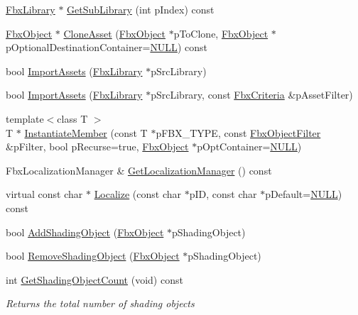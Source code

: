 \begin{DoxyCompactItemize}
\hyperlink{class_fbx_library}{Fbx\+Library} $\ast$ \hyperlink{class_fbx_library_a3a6f41a432b2f0db2966f51d8ccc511e}{Get\+Sub\+Library} (int p\+Index) const
\item 
\hyperlink{class_fbx_object}{Fbx\+Object} $\ast$ \hyperlink{class_fbx_library_ad1c56ae40f4e371c7e0395ce3362dbcc}{Clone\+Asset} (\hyperlink{class_fbx_object}{Fbx\+Object} $\ast$p\+To\+Clone, \hyperlink{class_fbx_object}{Fbx\+Object} $\ast$p\+Optional\+Destination\+Container=\hyperlink{fbxarch_8h_a070d2ce7b6bb7e5c05602aa8c308d0c4}{N\+U\+LL}) const
\item 
bool \hyperlink{class_fbx_library_a1b1dd291ec8d1858225190ae40600581}{Import\+Assets} (\hyperlink{class_fbx_library}{Fbx\+Library} $\ast$p\+Src\+Library)
\item 
bool \hyperlink{class_fbx_library_a2970dc9bde3b76130571ad959cd58389}{Import\+Assets} (\hyperlink{class_fbx_library}{Fbx\+Library} $\ast$p\+Src\+Library, const \hyperlink{class_fbx_criteria}{Fbx\+Criteria} \&p\+Asset\+Filter)
\item 
{\footnotesize template$<$class T $>$ }\\T $\ast$ \hyperlink{class_fbx_library_a9b4d4a5327f1ef11bd0251a968ce9452}{Instantiate\+Member} (const T $\ast$p\+F\+B\+X\+\_\+\+T\+Y\+PE, const \hyperlink{class_fbx_object_filter}{Fbx\+Object\+Filter} \&p\+Filter, bool p\+Recurse=true, \hyperlink{class_fbx_object}{Fbx\+Object} $\ast$p\+Opt\+Container=\hyperlink{fbxarch_8h_a070d2ce7b6bb7e5c05602aa8c308d0c4}{N\+U\+LL})
\item 
Fbx\+Localization\+Manager \& \hyperlink{class_fbx_library_a4fefd2b63aa4db5519af446945c0adef}{Get\+Localization\+Manager} () const
\item 
virtual const char $\ast$ \hyperlink{class_fbx_library_a6f71bf208f95cc8033123e173e64b298}{Localize} (const char $\ast$p\+ID, const char $\ast$p\+Default=\hyperlink{fbxarch_8h_a070d2ce7b6bb7e5c05602aa8c308d0c4}{N\+U\+LL}) const
\item 
bool \hyperlink{class_fbx_library_a041b82a3689dbf2912d81d0f69218ab7}{Add\+Shading\+Object} (\hyperlink{class_fbx_object}{Fbx\+Object} $\ast$p\+Shading\+Object)
\item 
bool \hyperlink{class_fbx_library_aafacfb4acfe28124217e4b0ffb0dcadc}{Remove\+Shading\+Object} (\hyperlink{class_fbx_object}{Fbx\+Object} $\ast$p\+Shading\+Object)
\item 
int \hyperlink{class_fbx_library_a0b5b034aeeb0d6a0f671fa4020ea1e07}{Get\+Shading\+Object\+Count} (void) const
\begin{DoxyCompactList}\small\item\em Returns the total number of shading objects \end{DoxyCompactList}\item 

\end{DoxyCompactItemize}
